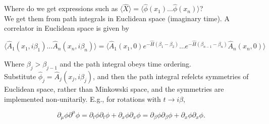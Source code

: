 \noindent Where do we get expressions such as $\langle \hat{X} \rangle = \langle \hat{\phi} (x_1) \dots \hat{\phi} (x_n)\rangle$? \\

\noindent We get them from path integrals in Euclidean space (imaginary time). A correlator in Euclidean space is given by 

\begin{equation}
\langle \hat{A}_1 (x_1, i\beta_1) \dots \hat{A}_n (x_n, i\beta_n) \rangle = \langle \hat{A}_1 (x_1, 0) e^{-\hat{H}(\beta_1 - \beta_2)} \dots e^{-\hat{H}(\beta_{n-1} - \beta_n)} \hat{A}_n(x_n, 0) \rangle
\end{equation}

\noindent Where $\beta_j > \beta_{j-1}$ and the path integral obeys time ordering. \\

\noindent Substitute $\hat{\phi}_j = \hat{A}_j (x_j, i\beta_j)$, and then the path integral refelcts symmetries of Euclidean space, rather than Minkowski space, and the symmetries are implemented non-unitarily. E.g., for rotations with $t \rightarrow i\beta$,

\begin{equation}
\partial_\mu \phi \partial^\mu \phi = \partial_t \phi \partial_t \phi + \partial_x \phi \partial_x \phi = \partial_\beta \phi \partial_\beta \phi + \partial_x \phi \partial_x \phi.
\end{equation}

